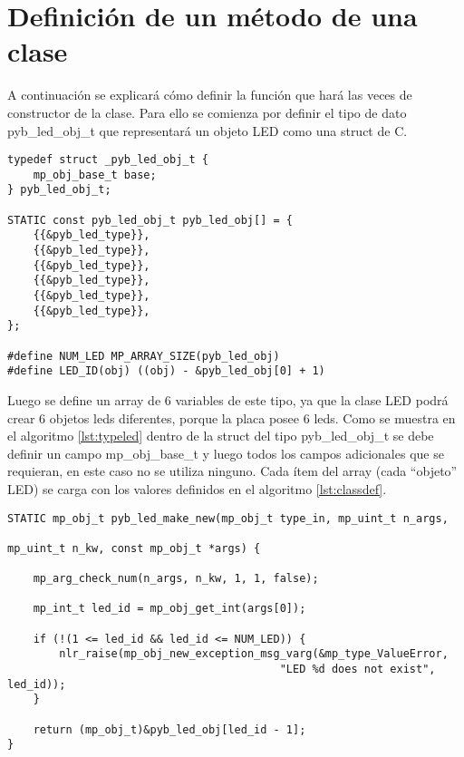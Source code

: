 \section{Definición de un método de una clase}

A continuación se explicará cómo definir la función que hará las veces de constructor de la clase. Para ello se comienza por definir el tipo de dato pyb\_led\_obj\_t que representará un objeto LED como una struct de C.

\begin{lstlisting}[label={lst:typeled},caption=Definición de un array de objetos LED para C.] 
typedef struct _pyb_led_obj_t {
    mp_obj_base_t base;
} pyb_led_obj_t;

STATIC const pyb_led_obj_t pyb_led_obj[] = {
    {{&pyb_led_type}},
    {{&pyb_led_type}},
    {{&pyb_led_type}},
    {{&pyb_led_type}},
    {{&pyb_led_type}},
    {{&pyb_led_type}},
};

#define NUM_LED MP_ARRAY_SIZE(pyb_led_obj)
#define LED_ID(obj) ((obj) - &pyb_led_obj[0] + 1)
\end{lstlisting}

Luego se define un array de 6 variables de este tipo, ya que la clase LED podrá crear 6 objetos leds diferentes, porque la placa posee 6 leds. Como se muestra en el algoritmo \ref{lst:typeled} dentro de la struct del tipo pyb\_led\_obj\_t se debe definir un campo mp\_obj\_base\_t y luego todos los campos adicionales que se requieran, en este caso no se utiliza ninguno.
Cada ítem del array (cada “objeto” LED) se carga con los valores definidos en el algoritmo \ref{lst:classdef}.

\begin{lstlisting}[label={lst:constructor},caption=Definición de la función constructor.] 
STATIC mp_obj_t pyb_led_make_new(mp_obj_t type_in, mp_uint_t n_args, 
																 mp_uint_t n_kw, const mp_obj_t *args) {
																
    mp_arg_check_num(n_args, n_kw, 1, 1, false);
		
    mp_int_t led_id = mp_obj_get_int(args[0]);
		
    if (!(1 <= led_id && led_id <= NUM_LED)) {
        nlr_raise(mp_obj_new_exception_msg_varg(&mp_type_ValueError,
				                          "LED %d does not exist", led_id));
    }
		
    return (mp_obj_t)&pyb_led_obj[led_id - 1];
}
\end{lstlisting}

